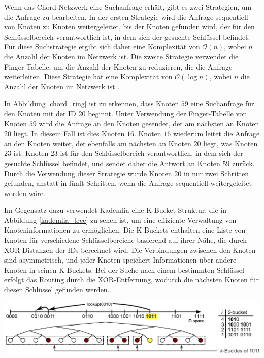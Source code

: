 \noindent Wenn das Chord-Netzwerk eine Suchanfrage erhält, gibt es zwei Strategien, um die Anfrage zu bearbeiten. In der ersten Strategie wird die Anfrage sequentiell von Knoten zu Knoten weitergeleitet, bis der Knoten gefunden wird, der für den Schlüsselbereich verantwortlich ist, in dem sich der gesuchte Schlüssel befindet. Für diese Suchstrategie ergibt sich daher eine Komplexität von $\mathcal{O}(n)$, wobei $n$ die Anzahl der Knoten im Netzwerk ist. Die zweite Strategie verwendet die Finger-Tabelle, um die Anzahl der Knoten zu reduzieren, die die Anfrage weiterleiten. Diese Strategie hat eine Komplexität von $\mathcal{O}(\log n)$, wobei $n$ die Anzahl der Knoten im Netzwerk ist \parencite[S. 810-811]{MedranoChavez_ChordKademliaHighChurnScenarios}. 

In Abbildung \ref{chord_ring} ist zu erkennen, dass Knoten $59$ eine Suchanfrage für den Knoten mit der ID $20$ beginnt. Unter Verwendung der Finger-Tabelle von Knoten $59$ wird die Anfrage an den Knoten gesendet, der am nächsten an Knoten $20$ liegt. In diesem Fall ist dies Knoten $16$. Knoten $16$ wiederum leitet die Anfrage an den Knoten weiter, der ebenfalls am nächsten an Knoten $20$ liegt, was Knoten $23$ ist. Knoten $23$ ist für den Schlüsselbereich verantwortlich, in dem sich der gesuchte Schlüssel befindet, und sendet daher die Antwort an Knoten $59$ zurück. Durch die Verwendung dieser Strategie wurde Knoten $20$ in nur zwei Schritten gefunden, anstatt in fünft Schritten, wenn die Anfrage sequentiell weitergeleitet worden wäre.    

Im Gegensatz dazu verwendet Kademlia eine K-Bucket-Struktur, die in Abbildung \ref{kademlia_tree} zu sehen ist, um eine effiziente Verwaltung von Knoteninformationen zu ermöglichen. Die K-Buckets enthalten eine Liste von Knoten für verschiedene Schlüsselbereiche basierend auf ihrer Nähe, die durch XOR-Distanzen der IDs berechnet wird. Die Verbindungen zwischen den Knoten sind asymmetrisch, und jeder Knoten speichert Informationen über andere Knoten in seinen K-Buckets. Bei der Suche nach einem bestimmten Schlüssel erfolgt das Routing durch die XOR-Entfernung, wodurch die nächsten Knoten für diesen Schlüssel gefunden werden.

\begin{center}
    \captionsetup{type=figure}
    \includegraphics[width=1\linewidth]{images/kademlia_tree_altered.png}
    \label{kademlia_tree}
\end{center}

